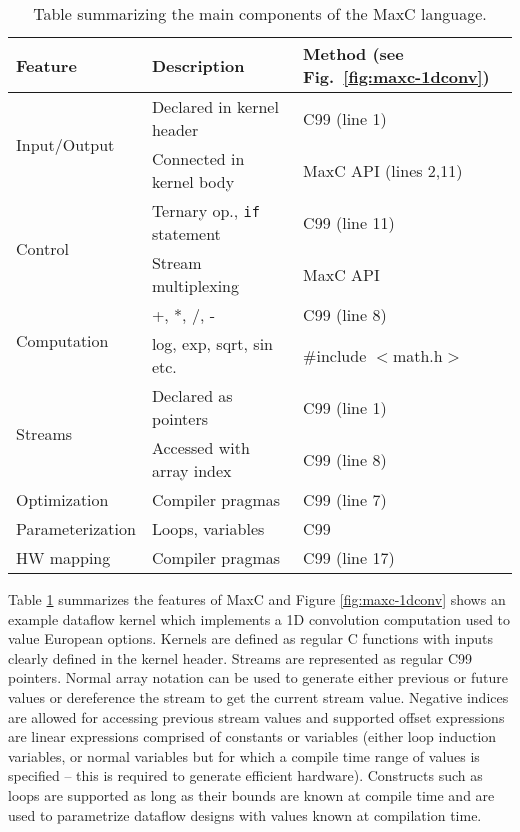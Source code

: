 \begin{table}[!h]
  \centering
\renewcommand{\arraystretch}{1.2}
\caption{Table summarizing the main components of the MaxC language.}
\label{table:maxc-features}
\begin{tabular}{l|l|l}
\hline
\bf{Feature}                   & \bf{Description}                   & \bf{Method (see Fig.~\ref{fig:maxc-1dconv})} \\
\hline\hline
  \multirow{2}{*}{Input/Output}         & Declared in kernel header          & C99 (line 1)                                 \\\cline{2-3}       & Connected in kernel body  & MaxC API (lines 2,11) \\
\hline
  \multirow{2}{*}{Control}     & Ternary op., \texttt{if} statement & C99 (line 11)                                \\\cline{2-3}      & Stream multiplexing       & MaxC API  \\
\hline
\multirow{2}{*}{Computation} & +, *, /, -                         & C99 (line 8)                           \\\cline{2-3} & log, exp, sqrt, sin etc.  & \#include $<$math.h$>$  \\
\hline
  \multirow{2}{*}{Streams}     & Declared as pointers               & C99 (line 1)                                 \\\cline{2-3}       & Accessed with array index & C99 (line 8) \\
\hline
  Optimization                 & Compiler pragmas                   & C99 (line 7)                                 \\
\hline
  Parameterization             & Loops, variables                   & C99                                          \\
\hline
HW mapping                  & Compiler pragmas                   & C99 (line 17)                                \\

\end{tabular}
\end{table}

Table \ref{table:maxc-features} summarizes the features of MaxC and
Figure \ref{fig:maxc-1dconv} shows an example dataflow kernel which
implements a 1D convolution computation used to value European
options.  Kernels are defined as regular C functions with inputs
clearly defined in the kernel header. Streams are represented as
regular C99 pointers.  Normal array notation can be used to generate
either previous or future values or dereference the stream to get the
current stream value. Negative indices are allowed for accessing
previous stream values and supported offset expressions are linear
expressions comprised of constants or variables (either loop induction
variables, or normal variables but for which a compile time range of
values is specified -- this is required to generate efficient
hardware). Constructs such as loops are supported as long as their
bounds are known at compile time and are used to parametrize dataflow
designs with values known at compilation time.

